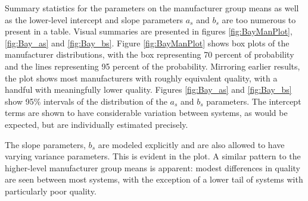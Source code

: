 \documentclass[a4paper]{article}
\begin{document}
Summary statistics for the parameters on the manufacturer group means as well as the lower-level intercept and slope parameters $a_s$ and $b_s$ are too numerous to present in a table. Visual summaries are presented in figures \ref{fig:BayManPlot}, \ref{fig:Bay_as} and \ref{fig:Bay_bs}. Figure \ref{fig:BayManPlot} shows box plots of the manufacturer distributions, with the box representing 70 percent of probability and the lines representing 95 percent of the probability. Mirroring earlier results, the plot shows most manufacturers with roughly equivalent quality, with a handful with meaningfully lower quality. Figures \ref{fig:Bay_as} and \ref{fig:Bay_bs} show 95\% intervals of the distribution of the $a_s$ and $b_s$ parameters. The intercept terms are shown to have considerable variation between systems, as would be expected, but are individually estimated precisely.

The slope parameters, $b_s$ are modeled explicitly and are also allowed to have varying variance parameters. This is evident in the plot. A similar pattern to the higher-level manufacturer group means is apparent: modest differences in quality are seen between most systems, with the exception of a lower tail of systems with particularly poor quality.
\end{document}
